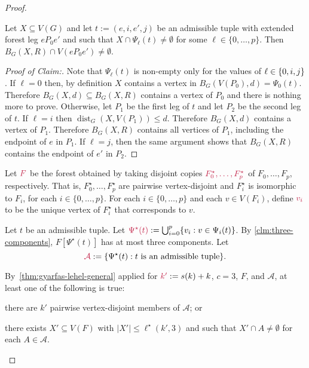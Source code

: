 \documentclass{patmorin}
\newenvironment{clmproof}{\begin{proof}[Proof of Claim:]\renewcommand{\qedsymbol}{\rule{1ex}{1ex}}}{\end{proof}}
\DeclareMathOperator{\dist}{dist}
\DeclarePairedDelimiter\set{\{}{\}}
\begin{document}
\begin{proof}
\begin{clm}\label{hungarians_hit}
  Let $X\subseteq V(G)$ and let $t:=(e,i,e',j)$ be an admissible tuple with extended forest leg $eP_0e'$ and such that $X\cap \Psi_\ell(t)\neq\emptyset$ for some $\ell\in\{0,\ldots,p\}$.  Then $B_G(X,R)\cap V(eP_0e')\neq\emptyset$.
\end{clm}

\begin{clmproof}
  Note that $\Psi_{\ell}(t)$ is non-empty only for the values of $\ell\in\set{0,i,j}$. 
  If $\ell=0$ then, by definition $X$ contains a vertex in $B_G(V(P_0),d)=\Psi_0(t)$.  Therefore $B_G(X,d)\subseteq B_G(X,R)$ contains a vertex of $P_0$ and there is nothing more to prove.
  Otherwise, let $P_1$ be the first leg of $t$ and let $P_2$ be the second leg of $t$.
  If $\ell=i$ then $\dist_G(X,V(P_1))\le d$.  Therefore $B_G(X,d)$ contains a vertex of $P_1$.  Therefore $B_G(X,R)$ contains all vertices of $P_1$, including the endpoint of $e$ in $P_1$.  If $\ell=j$, then the same argument shows that $B_G(X,R)$ contains the endpoint of $e'$ in $P_2$.
\end{clmproof}

Let $\mathdefin{F}$ be the forest obtained by taking 
disjoint copies $\mathdefin{F_0^\star,\ldots, F_p^\star}$ of $F_0,\ldots, F_p$, respectively.  That is,  $F_0^\star,\ldots, F_p^\star$ are pairwise vertex-disjoint and $F_i^\star$ is isomorphic to $F_i$, for each $i\in\{0,\ldots,p\}$.
For each $i\in\{0,\ldots,p\}$ and each $v\in V(F_i)$, define $\mathdefin{v_i}$ to be the unique vertex of $F^\star_i$ that corresponds to $v$.

Let $t$ be an admissible tuple. 
Let $\mathdefin{\Psi^\star(t)}:=\bigcup_{i=0}^p \{v_i:v\in \Psi_i(t)\}$.
By \cref{clm:three-components}, $F[\Psi^\star(t)]$ has at most three components. 
Let
\[
\mathdefin{\mathcal{A}}:=\{\Psi^\star(t):\text{$t$ is an admissible tuple}\}.
\]

By~\cref{thm:gyarfas-lehel-general} applied for
$\mathdefin{k'}:=s(k)+k$, $c=3$, $F$, and $\mathcal{A}$, at least one of the following is true:
\begin{inparaenum}[(a)]
  \item there are $k'$ pairwise vertex-disjoint members of $\mathcal{A}$; or 
  \item there exists $X'\subseteq V(F)$ with $|X'|\leq \ell^\star(k',3)$ and such that $X' \cap A\neq\emptyset$ for each $A\in \mathcal{A}$.
\end{inparaenum}


\end{proof}
\end{document}

